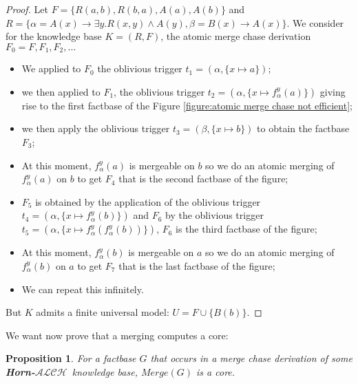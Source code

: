\documentclass{article}
\newtheorem{proposition}{Proposition}[section]
\theoremstyle{definition}
\theoremstyle{remark}
\newcommand{\Merge}{\textit{Merge}}
\newcommand{\ALCH}{\textbf{Horn-$\mathcal{ALCH}$}}
\begin{document}
\begin{proof} 
Let $F= \{R(a,b),R(b,a),A(a),A(b)\}$ and $R = \{\alpha = A(x) \rightarrow \exists y.R(x,y) \wedge A(y), \beta = B(x) \rightarrow A(x)\}$. We consider for the knowledge base $K=(R,F)$, the atomic merge chase derivation  $F_0 =F,F_1,F_2,...$
\begin{itemize}

\item We applied to $F_0$ the oblivious trigger $t_1 = (\alpha, \{x \mapsto a\})$;
\item we then applied to $F_1$, the oblivious trigger $t_2 = (\alpha, \{x \mapsto f_\alpha^y(a)\})$ giving rise to the first factbase of the Figure \ref{figure:atomic merge chase not efficient};
\item we then apply the oblivious trigger $t_3 = (\beta, \{x \mapsto b\})$ to obtain the factbase $F_3$;
\item At this moment, $f_\alpha^y(a)$ is mergeable on $b$ so we do an atomic merging of $f_\alpha^y(a)$ on $b$ to get $F_4$ that is the second factbase of the figure;
\item $F_5$ is obtained by the application of the oblivious trigger $t_4 = (\alpha, \{x \mapsto f_\alpha^y(b)\})$ and $F_6$ by the oblivious trigger $t_5 = (\alpha, \{x \mapsto f_\alpha^y(f_\alpha^y(b))\})$, $F_6$ is the third factbase of the figure;
\item At this moment, $f_\alpha^y(b)$ is mergeable on $a$ so we do an atomic merging of $f_\alpha^y(b)$ on $a$ to get $F_7$ that is the last factbase of the figure; 
\item We can repeat this infinitely. 

\end{itemize} 
 But $K$ admits a finite universal model: $U = F \cup \{B(b)\}$. 




\end{proof}



We want now prove that a merging computes a core:

\begin{proposition} \label{core}
For a factbase $G$ that occurs in a merge chase derivation of some \ALCH\ knowledge base, $\Merge(G)$ is a core.
\end{proposition}
\end{document}
